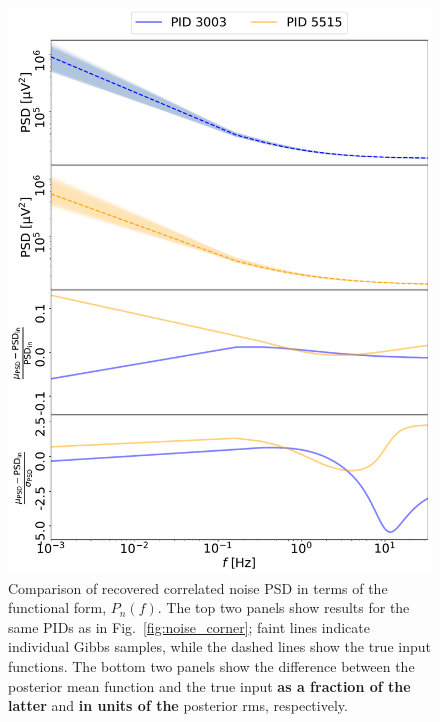 \documentclass[twocolumn]{aa}%
\begin{document}

\begin{figure}[t]
  \center
  \includegraphics[width = \linewidth]{figs/psd_in_vs_out_v4.pdf}
  \caption{Comparison of recovered correlated noise PSD in terms of
    the functional form, $P_n(f)$. The top two panels show results for
  the same PIDs as in Fig.~\ref{fig:noise_corner}; faint lines
  indicate individual Gibbs samples, while the dashed lines show the
  true input functions. The bottom two panels show the difference
  between the posterior mean function and the true input \textbf{as a fraction of the latter} and \textbf{in units of the} posterior rms, respectively.}
  \label{fig:noise_psd}
\end{figure}
\end{document}
